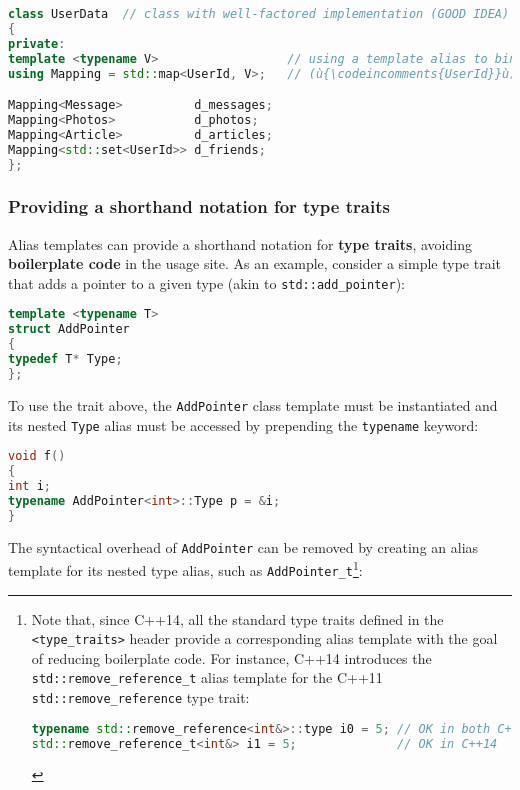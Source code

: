 \begin{lstlisting}[language=C++]
class UserData  // class with well-factored implementation (GOOD IDEA)
{
private:
template <typename V>                  // using a template alias to bind
using Mapping = std::map<UserId, V>;   // (ù{\codeincomments{UserId}}ù) as the key type

Mapping<Message>          d_messages;
Mapping<Photos>           d_photos;
Mapping<Article>          d_articles;
Mapping<std::set<UserId>> d_friends;
};
\end{lstlisting}


\subsubsection[Providing a shorthand notation for type traits]{Providing a shorthand notation for type traits}\label{providing-a-shorthand-notation-for-type-traits}

Alias templates can provide a shorthand notation for \textbf{type
traits}, avoiding \textbf{boilerplate code} in the usage site. As an
example, consider a simple type trait that adds a pointer to a given
type (akin to \texttt{std::add\_pointer}):

\begin{lstlisting}[language=C++]
template <typename T>
struct AddPointer
{
typedef T* Type;
};
\end{lstlisting}

\noindent To use the trait above, the \texttt{AddPointer} class template
must be instantiated and its nested \texttt{Type} alias must be
accessed by prepending the \texttt{typename} keyword:

\begin{lstlisting}[language=C++]
void f()
{
int i;
typename AddPointer<int>::Type p = &i;
}
\end{lstlisting}

\noindent The syntactical overhead of \texttt{AddPointer} can be removed by
creating an alias template for its nested type alias, such as
\texttt{AddPointer\_t}{\cprotect\footnote{Note that, since C++14, all
the standard type traits defined in the \texttt{<type\_traits>} header
provide a corresponding alias template with the goal of reducing
boilerplate code. For instance, C++14 introduces the
\texttt{std::remove\_reference\_t} alias template for the C++11
\texttt{std::remove\_reference} type trait:

\begin{lstlisting}[language=C++, basicstyle={\ttfamily\footnotesize}]
typename std::remove_reference<int&>::type i0 = 5; // OK in both C++11 and C++14
std::remove_reference_t<int&> i1 = 5;              // OK in C++14
\end{lstlisting}
}}:

